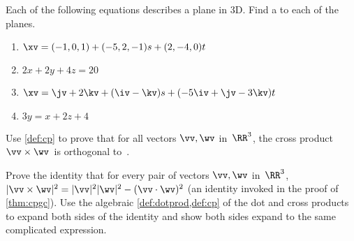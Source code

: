 \begin{exercise}  
Each of the following equations describes a plane in 3D.
Find a  to each of the planes.
\begin{enumerate}
\item \(\xv=(-1,0,1)+(-5,2,-1)s+(2,-4,0)t\)

\item \(2x+2y+4z=20\)


\item \(\xv=\jv+2\kv+(\iv-\kv)s+(-5\iv+\jv-3\kv)t\)
\answer{\(\propto\iv+8\jv+\kv\)}

\item \(3y=x+2z+4\)
\answer{\(\propto -\iv+3\jv-2\kv\)}


\end{enumerate}
\end{exercise}







\begin{exercise} \label{ex:cpga} 
Use \cref{def:cp} to prove that for all vectors \(\vv,\wv\) in~\(\RR^3\), the cross product~\(\vv\times\wv\)~is orthogonal to~\wv.
\end{exercise}




\begin{exercise} \label{ex:cpgc} 
Prove the identity that for every pair of vectors \(\vv,\wv\) in~\(\RR^3\), \(|\vv\times\wv|^2=|\vv|^2|\wv|^2-(\vv\cdot\wv)^2\) (an identity invoked in the proof of \cref{thm:cpgc}). 
Use the algebraic \cref{def:dotprod,def:cp} of the dot and cross products to expand both sides of the identity and show both sides expand to the same complicated expression.
\end{exercise}




